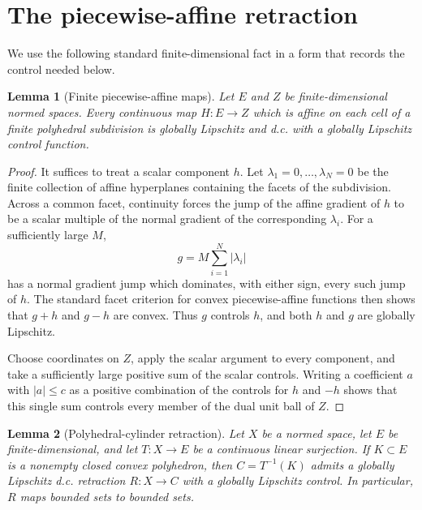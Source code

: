 \documentclass[11pt]{article}
\newtheorem{lemma}{Lemma}
\begin{document}
\section{The piecewise-affine retraction}

We use the following standard finite-dimensional fact in a form that records
the control needed below.

\begin{lemma}[Finite piecewise-affine maps]\label{lem:pwa}
Let $E$ and $Z$ be finite-dimensional normed spaces. Every continuous map
$H:E\to Z$ which is affine on each cell of a finite polyhedral subdivision
is globally Lipschitz and d.c. with a globally Lipschitz control function.
\end{lemma}

\begin{proof}
It suffices to treat a scalar component $h$. Let
$\lambda_1=0,\ldots,\lambda_N=0$ be the finite collection of affine
hyperplanes containing the facets of the subdivision. Across a common facet,
continuity forces the jump of the affine gradient of $h$ to be a scalar
multiple of the normal gradient of the corresponding $\lambda_i$. For a
sufficiently large $M$,
\[
 g=M\sum_{i=1}^N |\lambda_i|
\]
has a normal gradient jump which dominates, with either sign, every such jump
of $h$. The standard facet criterion for convex piecewise-affine functions
then shows that $g+h$ and $g-h$ are convex. Thus $g$ controls $h$, and
both $h$ and $g$ are globally Lipschitz.

Choose coordinates on $Z$, apply the scalar argument to every component,
and take a sufficiently large positive sum of the scalar controls. Writing a
coefficient $a$ with $|a|\le c$ as a positive combination of the controls
for $h$ and $-h$ shows that this single sum controls every member of the
dual unit ball of $Z$.
\end{proof}

\begin{lemma}[Polyhedral-cylinder retraction]\label{lem:retraction}
Let $X$ be a normed space, let $E$ be finite-dimensional, and let
$T:X\to E$ be a continuous linear surjection. If $K\subset E$ is a
nonempty closed convex polyhedron, then $C=T^{-1}(K)$ admits a globally
Lipschitz d.c. retraction $R:X\to C$ with a globally Lipschitz control.
In particular, $R$ maps bounded sets to bounded sets.
\end{lemma}
\end{document}

